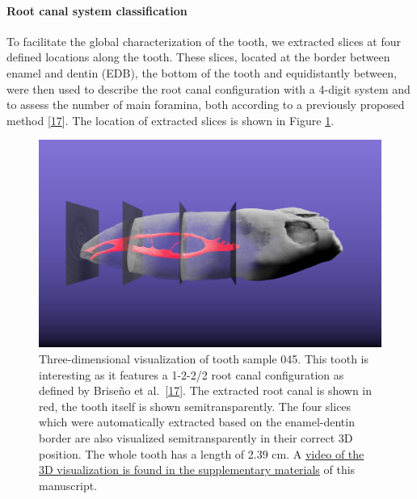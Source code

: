 \documentclass[
  american,
]{article}
\begin{document}
\hypertarget{root-canal-system-classification}{%
\paragraph{Root canal system classification}\label{root-canal-system-classification}}

To facilitate the global characterization of the tooth, we extracted slices at four defined locations along the tooth.
These slices, located at the border between enamel and dentin (EDB), the bottom of the tooth and equidistantly between, were then used to describe the root canal configuration with a 4-digit system and to assess the number of main foramina, both according to a previously proposed method {[}\protect\hyperlink{ref-ZTgDEakx}{17}{]}.
The location of extracted slices is shown in Figure \ref{fig:3dmevislab}.

\begin{figure}
\hypertarget{fig:3dmevislab}{%
\centering
\includegraphics{images/Tooth045.MeVisLab.png}
\caption{Three-dimensional visualization of tooth sample 045.
This tooth is interesting as it features a 1-2-2/2 root canal configuration as defined by Briseño et al.~{[}\protect\hyperlink{ref-ZTgDEakx}{17}{]}.
The extracted root canal is shown in red, the tooth itself is shown semitransparently.
The four slices which were automatically extracted based on the enamel-dentin border are also visualized semitransparently in their correct 3D position.
The whole tooth has a length of 2.39 cm.
A \href{https://github.com/habi/zmk-tooth-cohort-method-manuscript/blob/master/content/images/tooth045.mp4?raw=true}{video of the 3D visualization is found in the supplementary materials} of this manuscript.}\label{fig:3dmevislab}
}
\end{figure}
\end{document}

